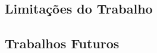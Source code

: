 \documentclass[12pt]{article}
\begin{document}
\subsection{Limitações do Trabalho}

\subsection{Trabalhos Futuros}


\printbibliography[title={REFERÊNCIAS}]
\end{document}
